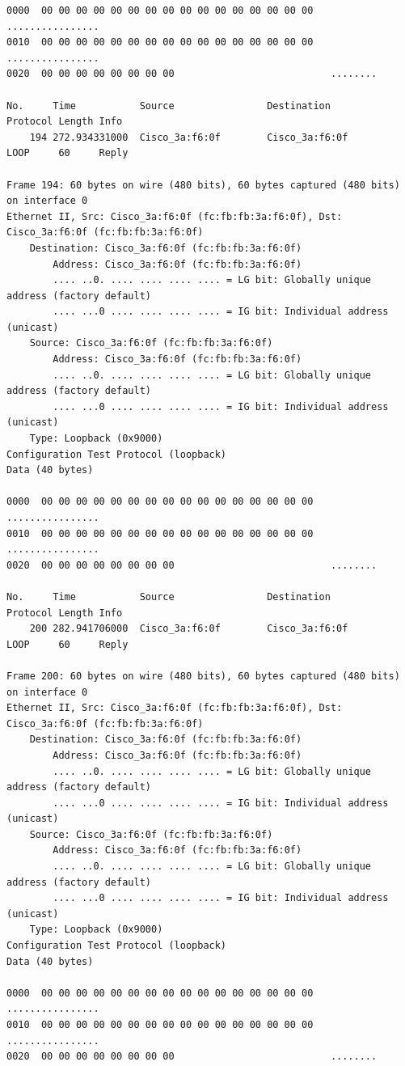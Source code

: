 \documentclass[a4paper,11pt]{article}
\begin{document}
\begin{lstlisting}
0000  00 00 00 00 00 00 00 00 00 00 00 00 00 00 00 00   ................
0010  00 00 00 00 00 00 00 00 00 00 00 00 00 00 00 00   ................
0020  00 00 00 00 00 00 00 00                           ........

No.     Time           Source                Destination           Protocol Length Info
    194 272.934331000  Cisco_3a:f6:0f        Cisco_3a:f6:0f        LOOP     60     Reply

Frame 194: 60 bytes on wire (480 bits), 60 bytes captured (480 bits) on interface 0
Ethernet II, Src: Cisco_3a:f6:0f (fc:fb:fb:3a:f6:0f), Dst: Cisco_3a:f6:0f (fc:fb:fb:3a:f6:0f)
    Destination: Cisco_3a:f6:0f (fc:fb:fb:3a:f6:0f)
        Address: Cisco_3a:f6:0f (fc:fb:fb:3a:f6:0f)
        .... ..0. .... .... .... .... = LG bit: Globally unique address (factory default)
        .... ...0 .... .... .... .... = IG bit: Individual address (unicast)
    Source: Cisco_3a:f6:0f (fc:fb:fb:3a:f6:0f)
        Address: Cisco_3a:f6:0f (fc:fb:fb:3a:f6:0f)
        .... ..0. .... .... .... .... = LG bit: Globally unique address (factory default)
        .... ...0 .... .... .... .... = IG bit: Individual address (unicast)
    Type: Loopback (0x9000)
Configuration Test Protocol (loopback)
Data (40 bytes)

0000  00 00 00 00 00 00 00 00 00 00 00 00 00 00 00 00   ................
0010  00 00 00 00 00 00 00 00 00 00 00 00 00 00 00 00   ................
0020  00 00 00 00 00 00 00 00                           ........

No.     Time           Source                Destination           Protocol Length Info
    200 282.941706000  Cisco_3a:f6:0f        Cisco_3a:f6:0f        LOOP     60     Reply

Frame 200: 60 bytes on wire (480 bits), 60 bytes captured (480 bits) on interface 0
Ethernet II, Src: Cisco_3a:f6:0f (fc:fb:fb:3a:f6:0f), Dst: Cisco_3a:f6:0f (fc:fb:fb:3a:f6:0f)
    Destination: Cisco_3a:f6:0f (fc:fb:fb:3a:f6:0f)
        Address: Cisco_3a:f6:0f (fc:fb:fb:3a:f6:0f)
        .... ..0. .... .... .... .... = LG bit: Globally unique address (factory default)
        .... ...0 .... .... .... .... = IG bit: Individual address (unicast)
    Source: Cisco_3a:f6:0f (fc:fb:fb:3a:f6:0f)
        Address: Cisco_3a:f6:0f (fc:fb:fb:3a:f6:0f)
        .... ..0. .... .... .... .... = LG bit: Globally unique address (factory default)
        .... ...0 .... .... .... .... = IG bit: Individual address (unicast)
    Type: Loopback (0x9000)
Configuration Test Protocol (loopback)
Data (40 bytes)

0000  00 00 00 00 00 00 00 00 00 00 00 00 00 00 00 00   ................
0010  00 00 00 00 00 00 00 00 00 00 00 00 00 00 00 00   ................
0020  00 00 00 00 00 00 00 00                           ........
\end{lstlisting}
\end{document}
